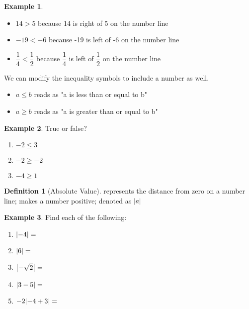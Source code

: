\documentclass[addpoints,12pt]{exam}
\theoremstyle{definition}
\newtheorem{example}{Example}[subsection]
\newtheorem{definition}{Definition}[subsection]
\begin{document}
\begin{example}\mbox{}\\
\begin{itemize}
\item $14 > 5$ because 14 is right of 5 on the number line
\item $-19 < -6$ because -19 is left of -6 on the number line
\item $\dfrac{1}{4} < \dfrac{1}{2}$ because $\dfrac{1}{4}$ is left of $\dfrac{1}{2}$ on the number line
\end{itemize}
\end{example}

\vspace{.25in}

\noindent We can modify the inequality symbols to include a number as well.
\begin{itemize}
\item $a \le b$ reads as "a is less than or equal to b"
\item $a \ge b$ reads as "a is greater than or equal to b"
\end{itemize}

\begin{example}
True or false?
\begin{enumerate}
\item $-2 \le 3$
\item $-2 \ge -2$
\item $-4 \ge 1$
\end{enumerate}
\end{example}

\begin{definition}[Absolute Value]
represents the distance from zero on a number line; makes a number positive; denoted as $\abs{a}$
\end{definition}

\vspace{.25in}

\begin{example}
Find each of the following:
\begin{enumerate}
\item $\abs{-4} = $
\item $\abs{6} = $
\item $\abs{-\sqrt{2}} = $
\item $\abs{3-5} = $
\item $-2\abs{-4+3} = $
\end{enumerate}
\end{example}
\end{document}
